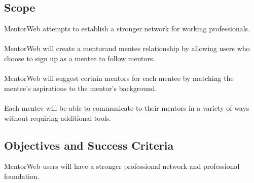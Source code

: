 \documentclass[11pt]{article}
\begin{document}
    \subsection{Scope}
        MentorWeb attempts to establish a stronger network for
        working professionals.\\
        \\
        MentorWeb will create a mentorand
        mentee relationship by allowing users who choose to sign
        up as a mentee to follow mentors.\\
        \\
        MentorWeb will suggest certain mentors for each
        mentee by matching the mentee's aspirations
        to the mentor's background.\\
        \\
        Each mentee will be able to communicate to their
        mentors in a variety of ways without requiring additional
        tools.

    \subsection{Objectives and Success Criteria}
        MentorWeb users will have a stronger professional
        network and professional foundation.

\end{document}
